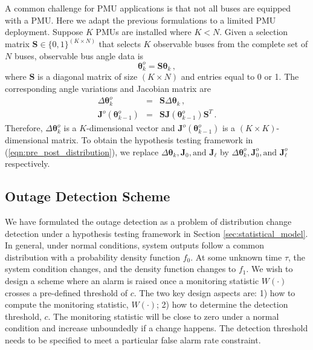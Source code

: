 A common challenge for PMU applications is that not all buses are equipped with a PMU. Here we adapt the previous formulations to a limited PMU deployment. Suppose $K$ PMUs are installed where $K < N$. Given a selection matrix $\mathbf{S} \in \{ 0 ,1 \}^{(K \times N)}$ that selects $K$ observable buses from the complete set of $N$ buses, observable bus angle data is 
\begin{equation}
\boldsymbol{\theta}^o_k = \mathbf{S} \boldsymbol{\theta}_k \,,
\end{equation} where $\mathbf{S}$ is a diagonal matrix of size $(K \times N)$ and entries equal to 0 or 1. The corresponding angle variations and Jacobian matrix are 
\begin{eqnarray}
\Delta\boldsymbol{\theta}^o_{k} &=& \mathbf{S} \Delta\boldsymbol{\theta}_k \,, \\
\mathbf{J}^o(\boldsymbol{\theta}^o_{k-1}) &=& \mathbf{S} \mathbf{J}(\boldsymbol{\theta}^o_{k-1}) \mathbf{S}^T \,.
\end{eqnarray}
Therefore, $\Delta\boldsymbol{\theta}^o_{k}$ is a $K$-dimensional vector and $\mathbf{J}^o(\boldsymbol{\theta}^o_{k-1})$ is a $(K \times K)$-dimensional matrix. To obtain the hypothesis testing framework in (\ref{eqn:pre_post_distribution}), we replace $\Delta\boldsymbol{\theta}_k, \mathbf{J}_0, \text{and } \mathbf{J}_{\ell}$ by $\Delta\boldsymbol{\theta}^o_k, \mathbf{J}^o_0, \text{and } \mathbf{J}^o_{\ell}$ respectively. 


\subsection{Outage Detection Scheme}
\label{sec:detection_scheme}
We have formulated the outage detection as a problem of distribution change detection under a hypothesis testing framework in Section \ref{sec:statistical_model}. In general, under normal conditions, system outputs follow a common distribution with a probability density function $f_0$. At some unknown time $\tau$, the system condition changes, and the density function changes to $f_1$. We wish to design a scheme where an alarm is raised once a monitoring statistic $W(\cdot)$ crosses a pre-defined threshold of $c$. The two key design aspects are: 1) how to compute the monitoring statistic, $W(\cdot)$; 2) how to determine the detection threshold, $c$. The monitoring statistic will be close to zero under a normal condition and increase unboundedly if a change happens. The detection threshold needs to be specified to meet a particular false alarm rate constraint. 

